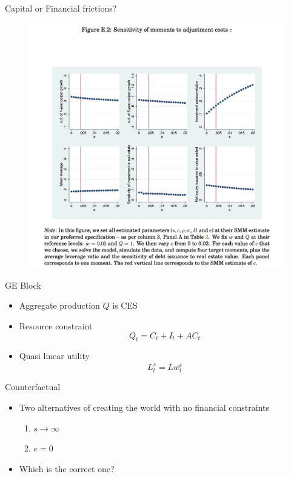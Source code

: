 \documentclass[english,xcolor=svgnames,aspectratio=169]{beamer}
\begin{document}
\begin{frame}{Capital or Financial frictions?}
\begin{figure}
\includegraphics[scale=0.35]{figures/cchst_2}
\end{figure}
\end{frame}

\begin{frame}{GE Block}
\begin{itemize}
\item Aggregate production $Q$ is CES
\item Resource constraint
\[Q_t = C_t + I_t + AC_t\]
\item Quasi linear utility
\[L^s_t = \bar{L} w^{\epsilon}_t\] 
\end{itemize}
\end{frame}

\begin{frame}{Counterfactual}
\begin{itemize}
\item Two alternatives of creating the world with no financial constraints
\begin{enumerate}
\item $s \rightarrow \infty$
\item $e = 0$
\end{enumerate}
\item Which is the correct one?
\end{itemize}
\end{frame}
\end{document}
